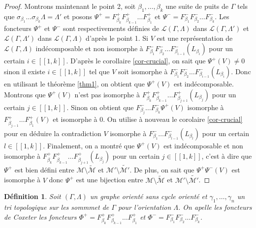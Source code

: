 \documentclass[a4paper,10pt]{article}
\newtheorem{defi}[thm]{Définition}%
\begin{document}
\begin{proof}
Montrons maintenant le point 2, soit $\beta_{1}, \dots, \beta_{k}$ une suite de puits de $\Gamma$ tels que $\sigma_{\beta_{1}}\dots\sigma_{\beta_{k}}\Lambda =  \Lambda'$ et posons $\Psi^{+} = F^{+}_{\beta_{k}}F^{+}_{\beta_{k-1}} \dots F^{+}_{\beta_{1}}$ et $\Psi^{-} = F^{-}_{\beta_{1}}F^{-}_{\beta_{2}} \dots F^{-}_{\beta_{k}}$. Les foncteurs $\Psi^{+}$ et $\Psi^{-}$ sont respectivements définies de $\mathscr L(\Gamma,\Lambda)$ dans $\mathscr L(\Gamma, \Lambda')$ et $\mathscr L(\Gamma,\Lambda')$ dans $\mathscr L(\Gamma, \Lambda)$ d'après le point 1.
Si $V$ est une représentation de $\mathscr L(\Gamma,\Lambda)$ indécomposable et non isomorphe à $F^{-}_{\beta_{1}}F^{-}_{\beta_{2}} \dots F^{-}_{\beta_{i-1}}(L_{\beta_{i}})$ pour un certain $i \in [\![1,k]\!]$. D'après le corollaire \ref{cor-crucial}, on sait que $\Psi^{+}(V) \neq 0$ sinon il existe $i \in [\![1,k]\!]$ tel que $V$ soit isomorphe  à $F^{-}_{\beta_{1}}F^{-}_{\beta_{2}} \dots F^{-}_{\beta_{i-1}}(L_{\beta_{i}})$.
Donc en utilisant le théorème \ref{thm1}, on obtient que $\Psi^{+}(V)$ est indécomposable. Montrons que $\Psi^{+}(V)$ n'est pas isomorphe à $F^{+}_{\beta_{k}}F^{+}_{\beta_{k-1}} \dots F^{+}_{\beta_{j+1}}(L_{\beta_{j}})$ pour un certain $j\in [\![1,k]\!]$. Sinon on obtient que $F^{-}_{\beta_{j}} \dots F^{-}_{\beta_{k}}\Psi^{+}(V)$ isomorphe à $F^{+}_{\beta_{j-1}} \dots F^{+}_{\beta_{1}}(V)$ et isomorphe à $0$. On utilise à nouveau le corolaire \ref{cor-crucial} pour en déduire la contradiction $V$ isomorphe à $F^{-}_{\beta_{1}} \dots F^{-}_{\beta_{l-1}}(L_{\beta_{l}})$ pour un certain $l \in [\![1,k]\!]$. Finalement, on a montré que $\Psi^{+}(V)$ est indécomposable et non isomorphe à $F^{+}_{\beta_{k}}F^{+}_{\beta_{k-1}} \dots F^{+}_{\beta_{j+1}}(L_{\beta_{j}})$ pour un certain $j\in [\![1,k]\!]$, c'est à dire que $\Psi^{+}$ est bien défini entre $\mathscr M \setminus \widetilde{\mathscr M}$ et  $\mathscr M' \setminus \widetilde{\mathscr M'}$. De plus, on sait que $\Psi^{+}\Psi^{-}(V)$ est isomorphe à $V$ donc $\Psi^{+}$ est une bijection entre $\mathscr M \setminus \widetilde{\mathscr M}$ et  $\mathscr M' \setminus \widetilde{\mathscr M'}$.
\end{proof}

\begin{defi}
	Soit $(\Gamma,\Lambda)$ un graphe orienté sans cycle orienté et $\gamma_{1}, \dots, \gamma_{n}$ un tri topologique sur les sommmet de $\Gamma$ pour l'orientation $\Lambda$. On apelle les \emph{foncteurs de Coxeter} les foncteurs $\Phi^{+} = F^{+}_{\beta_{k}}F^{+}_{\beta_{k-1}} \dots F^{+}_{\beta_{1}}$ et $\Phi^{-} = F^{-}_{\beta_{1}}F^{-}_{\beta_{2}} \dots F^{-}_{\beta_{k}}$.
\end{defi}
\end{document}
